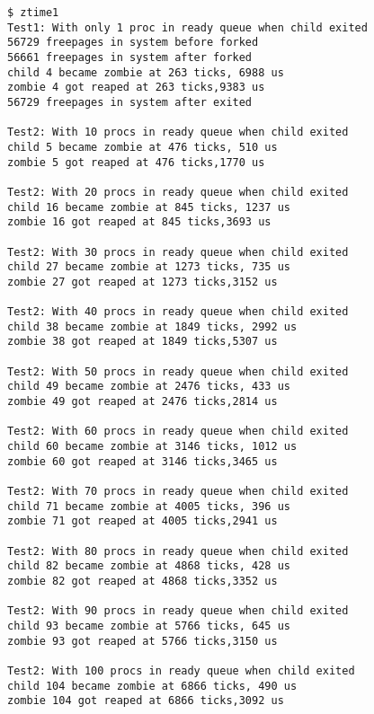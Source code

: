 \documentclass[varwidth=80em,crop]{standalone}
\begin{document}
\begin{verbatim}
$ ztime1
Test1: With only 1 proc in ready queue when child exited
56729 freepages in system before forked
56661 freepages in system after forked
child 4 became zombie at 263 ticks, 6988 us
zombie 4 got reaped at 263 ticks,9383 us
56729 freepages in system after exited

Test2: With 10 procs in ready queue when child exited
child 5 became zombie at 476 ticks, 510 us
zombie 5 got reaped at 476 ticks,1770 us

Test2: With 20 procs in ready queue when child exited
child 16 became zombie at 845 ticks, 1237 us
zombie 16 got reaped at 845 ticks,3693 us

Test2: With 30 procs in ready queue when child exited
child 27 became zombie at 1273 ticks, 735 us
zombie 27 got reaped at 1273 ticks,3152 us

Test2: With 40 procs in ready queue when child exited
child 38 became zombie at 1849 ticks, 2992 us
zombie 38 got reaped at 1849 ticks,5307 us

Test2: With 50 procs in ready queue when child exited
child 49 became zombie at 2476 ticks, 433 us
zombie 49 got reaped at 2476 ticks,2814 us

Test2: With 60 procs in ready queue when child exited
child 60 became zombie at 3146 ticks, 1012 us
zombie 60 got reaped at 3146 ticks,3465 us

Test2: With 70 procs in ready queue when child exited
child 71 became zombie at 4005 ticks, 396 us
zombie 71 got reaped at 4005 ticks,2941 us

Test2: With 80 procs in ready queue when child exited
child 82 became zombie at 4868 ticks, 428 us
zombie 82 got reaped at 4868 ticks,3352 us

Test2: With 90 procs in ready queue when child exited
child 93 became zombie at 5766 ticks, 645 us
zombie 93 got reaped at 5766 ticks,3150 us

Test2: With 100 procs in ready queue when child exited
child 104 became zombie at 6866 ticks, 490 us
zombie 104 got reaped at 6866 ticks,3092 us
\end{verbatim}
\end{document}

